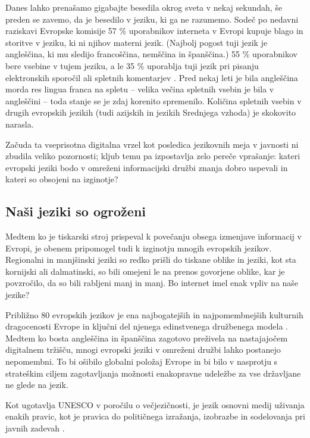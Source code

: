 \begin{multicols}{2}
Danes lahko prenašamo gigabajte besedila okrog sveta v nekaj sekundah, še preden se zavemo, da je besedilo v jeziku, ki ga ne razumemo. Sodeč po nedavni raziskavi Evropske komisije 57 \% uporabnikov interneta v Evropi kupuje blago in storitve v jeziku, ki ni njihov materni jezik. (Naj\-bolj pogost tuji jezik je angleščina, ki mu sledijo francoščina, nemščina in španščina.) 55 \% uporabnikov bere vsebine v tujem jeziku, a le 35 \% uporab\-lja tuji jezik pri pisanju elektronskih sporočil ali spletnih komentarjev \cite{EC1}.  Pred nekaj leti je bila angleščina morda res lingua franca na spletu – velika večina spletnih vsebin je bila v angleščini – toda stanje se je zdaj kore\-nito spremenilo. Količina spletnih vsebin v drugih evropskih jezikih (tudi azijskih in jezikih Srednjega vzhoda) je skokovito narasla.

Začuda ta vseprisotna digitalna vrzel kot posledica jezikovnih meja v javnosti ni zbudila veliko pozornosti; kljub temu pa izpostav\-lja zelo pereče vprašanje: kateri evropski jeziki bodo v omreženi informacij\-ski družbi znanja dobro uspevali in kateri so obsojeni na izginotje?

\subsection{Naši jeziki so ogroženi}

Medtem ko je tiskarski stroj prispeval k povečanju obsega izmenjave informacij v Evropi, je obenem pripomogel tudi k izginotju mnogih evropskih jezikov. Regionalni in manjšinski jeziki so redko prišli do tiskane oblike in jeziki, kot sta kornijski ali dalmatinski, so bili omejeni le na prenos go\-vorjene oblike, kar je povzročilo, da so bili rab\-ljeni manj in manj. Bo internet imel enak vpliv na naše jezike?


Približno 80 evropskih jezikov je ena naj\-bogatejših in naj\-pomembnejših kulturnih dragocenosti Evrope in ključni del njenega edinstvenega družbenega modela \cite{EC2}.  Medtem ko bosta angleščina in španščina zagotovo preživela na nastajajočem digi\-talnem tržišču, mnogi evropski jeziki v omreženi družbi lahko postanejo nepomembni. To bi ošibilo globalni položaj Evrope in bi bilo v nasprotju s strateškim ciljem zagotav\-ljanja možnosti enakopravne udeležbe za vse držav\-ljane ne glede na jezik.

Kot ugotav\-lja UNESCO v poročilu o večjezičnosti, je jezik osnovni medij uživanja enakih pravic, kot je pravica do političnega izražanja, izobrazbe in sodelovanja pri javnih zadevah \cite{Unesco1}.


\end{multicols}

